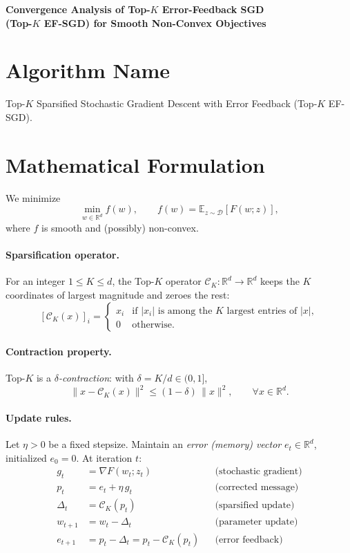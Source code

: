 \documentclass[11pt]{article}
\theoremstyle{plain}
\begin{document}
\begin{center}
{\Large\bfseries Convergence Analysis of Top-$K$ Error-Feedback SGD\\ (Top-$K$ EF-SGD) for Smooth Non-Convex Objectives}
\end{center}

\section*{Algorithm Name}
Top-$K$ Sparsified Stochastic Gradient Descent with Error Feedback (Top-$K$ EF-SGD).

\section*{Mathematical Formulation}

We minimize
\[
\min_{w\in\mathbb{R}^d} f(w), \qquad f(w)=\mathbb{E}_{z\sim\mathcal{D}}[F(w;z)],
\]
where $f$ is smooth and (possibly) non-convex.

\paragraph{Sparsification operator.}
For an integer $1\le K\le d$, the Top-$K$ operator $\mathcal{C}_K:\mathbb{R}^d\to\mathbb{R}^d$ keeps the $K$ coordinates of largest magnitude and zeroes the rest:
\[
[\mathcal{C}_K(x)]_i =
\begin{cases}
x_i & \text{if } |x_i| \text{ is among the } K \text{ largest entries of } |x|,\\[2pt]
0 & \text{otherwise.}
\end{cases}
\]

\paragraph{Contraction property.}
Top-$K$ is a \emph{$\delta$-contraction}: with $\delta = K/d \in (0,1]$,
\[
\big\|x-\mathcal{C}_K(x)\big\|^2 \le (1-\delta)\,\|x\|^2,\qquad \forall x\in\mathbb{R}^d .
\tag{C}
\]

\paragraph{Update rules.}
Let $\eta>0$ be a fixed stepsize. Maintain an \emph{error (memory) vector} $e_t\in\mathbb{R}^d$, initialized $e_0=0$. At iteration $t$:
\begin{align}
g_t &= \nabla F(w_t;z_t) && \text{(stochastic gradient)}\\
p_t &= e_t + \eta\, g_t && \text{(corrected message)}\\
\Delta_t &= \mathcal{C}_K(p_t) && \text{(sparsified update)}\\
w_{t+1} &= w_t - \Delta_t && \text{(parameter update)}\\
e_{t+1} &= p_t - \Delta_t = p_t - \mathcal{C}_K(p_t) && \text{(error feedback)}
\end{align}
\end{document}
